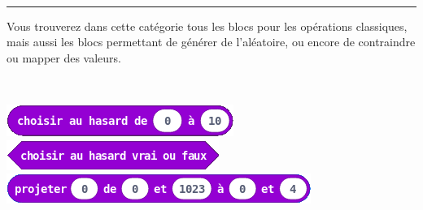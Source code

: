 \begin{minipage}[t]{0.75\linewidth}

    \begin{blocMaths}\\
      \rule{-0.25em}{2em}
      Vous trouverez dans cette catégorie tous les blocs pour les opérations classiques, mais aussi les blocs permettant de générer de l'aléatoire, ou encore de contraindre ou mapper des valeurs.


    \end{blocMaths}

\end{minipage}
\hfill
\begin{minipage}[t]{0.25\linewidth}~\\
  \vspace{5mm}

    \includegraphics[scale=0.4]{res/blocsMkCd/MB_makecode_maths-aleaEntreBornes.png}\\[0.5em]
    \includegraphics[scale=0.4]{res/blocsMkCd/MB_makecode_maths-aleaVraiFaux.png}\\[0.5em]
    \includegraphics[scale=0.4]{res/blocsMkCd/MB_makecode_maths-mapper.png}\\[0.5em]


\end{minipage}

